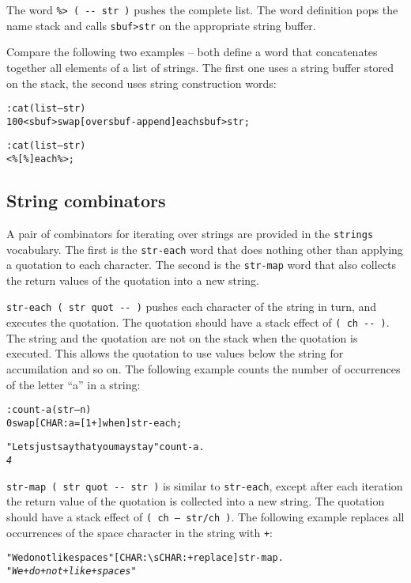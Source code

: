 \documentclass[english]{article}
\begin{document}
The word \texttt{\%> ( -{}- str )} pushes the complete list. The word
definition pops the name stack and calls \texttt{sbuf>str} on the
appropriate string buffer.

Compare the following two examples -- both define a word that concatenates together all elements of a list of strings. The first one uses a string buffer stored on the stack, the second uses string construction words:

\begin{alltt}
: cat ( list -- str )
    100 <sbuf> swap {[} over sbuf-append {]} each sbuf>str ;

: cat ( list -- str )
    <\% {[} \% {]} each \%> ;
\end{alltt}

\subsection{String combinators}

A pair of combinators for iterating over strings are provided in the \texttt{strings} vocabulary. The first is the \texttt{str-each} word that does nothing other than applying a quotation to each character. The second is the \texttt{str-map} word that also collects the return values of the quotation into a new string.

\texttt{str-each ( str quot -{}- )} pushes each character of the string in turn, and executes the quotation. The quotation should have a stack effect of \texttt{( ch -{}- )}. The string and the quotation are not on the stack when the quotation is executed. This allows the quotation to use values below the string for accumilation and so on. The following example counts the number of occurrences of the letter ``a'' in a string:

\begin{alltt}
: count-a ( str -- n )
    0 swap {[} CHAR: a = {[} 1 + {]} when {]} str-each ;

"Lets just say that you may stay" count-a .
\emph{4}
\end{alltt}

\texttt{str-map ( str quot -{}- str )} is similar to \texttt{str-each}, except after each iteration the return value of the quotation is collected into a new string. The quotation should have a stack effect of \texttt{( ch -- str/ch )}. The following example replaces all occurrences of the space character in the string with \texttt{+}:

\begin{alltt}
"We do not like spaces" {[} CHAR: \textbackslash{}s CHAR: + replace {]} str-map .
\emph{"We+do+not+like+spaces"}
\end{alltt}
\end{document}
